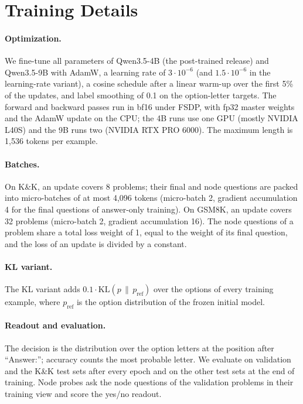 \documentclass[10pt]{article}
\begin{document}



\appendix

\section{Training Details}
\label{app:training}
\paragraph{Optimization.} We fine-tune all parameters of Qwen3.5-4B (the post-trained release) and Qwen3.5-9B with
AdamW, a learning rate of $3\cdot10^{-6}$ (and $1.5\cdot10^{-6}$ in the learning-rate variant), a cosine schedule after
a linear warm-up over the first 5\% of the updates, and label smoothing of 0.1 on the option-letter targets. The
forward and backward passes run in bf16 under FSDP, with fp32 master weights and the AdamW update on the CPU; the 4B
runs use one GPU (mostly NVIDIA L40S) and the 9B runs two (NVIDIA RTX PRO 6000). The maximum length is 1,536 tokens per
example.
\paragraph{Batches.} On K\&K, an update covers 8 problems; their final and node questions are packed into micro-batches
of at most 4,096 tokens (micro-batch 2, gradient accumulation 4 for the final questions of answer-only training). On
GSM8K, an update covers 32 problems (micro-batch 2, gradient accumulation 16). The node questions of a problem share a
total loss weight of 1, equal to the weight of its final question, and the loss of an update is divided by a constant.
\paragraph{KL variant.} The KL variant adds $0.1\cdot\mathrm{KL}(p\,\|\,p_{\mathrm{ref}})$ over the options of every
training example, where $p_{\mathrm{ref}}$ is the option distribution of the frozen initial model.
\paragraph{Readout and evaluation.} The decision is the distribution over the option letters at the position after
``Answer:''; accuracy counts the most probable letter. We evaluate on validation and the K\&K test sets after every
epoch and on the other test sets at the end of training. Node probes ask the node questions of the validation problems
in their training view and score the yes/no readout.
\end{document}
